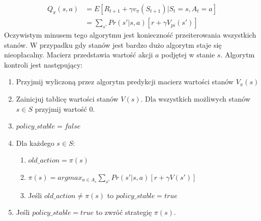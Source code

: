 \documentclass[12pt]{book}
\theoremstyle{plain}
\begin{document}
\begin{equation}
\begin{split}
Q_{\pi}(s,a) &= E[R_{t+1}+\gamma v_{\pi}(S_{t+1}) | S_t=s, A_t=a]  \\
           &= \sum_{s'}Pr(s'|s,a)[r+\gamma V_{pi}(s')] 
\end{split}
\end{equation}
Oczywistym minusem tego algorytmu jest konieczność przeiterowania wszystkich stanów. W przypadku gdy stanów jest bardzo dużo algorytm staje się nieopłacalny.
Macierz przedstawia wartość akcji $a$ podjętej w stanie $s$. Algorytm kontroli jest następujący:
\begin{enumerate}
\item{Przyjmij wyliczoną przez algorytm predykcji macierz wartości stanów $V_{\pi}(s)$}
\item{Zainicjuj tablicę wartości stanów $V(s)$. Dla wszystkich możliwych stanów $s \in S$ przyjmij wartość $0$.}
\item{$policy\_stable=false$}
\item{Dla każdego $s \in S$:}
  \begin{enumerate}
    \item $old\_action=\pi(s)$
    \item $\pi(s)=argmax_{a\in A_s} \sum_{s'}Pr(s'|s,a)[r+\gamma V(s')]$
    \item Jeśli $old\_action \neq \pi(s)$ to $policy\_stable = true$
  \end{enumerate}
\item Jeśli $policy\_stable=true$ to zwróć strategię $\pi(s)$.
\end{enumerate}
\end{document}

